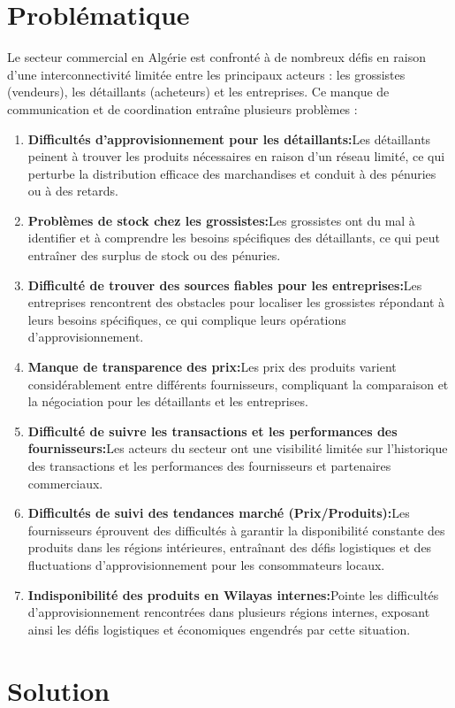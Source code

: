 \documentclass[edit,12pt,a4paper,ChapStyle,oneside,doubleinterligne]{report}
\begin{document}
\section{Problématique}
Le secteur commercial en Algérie est confronté à de nombreux défis en raison d'une interconnectivité limitée entre les principaux acteurs : les grossistes (vendeurs), les détaillants (acheteurs) et les entreprises. Ce manque de communication et de coordination entraîne plusieurs problèmes :
\begin{enumerate}
    \item \textbf{Difficultés d'approvisionnement pour les détaillants:}Les détaillants peinent à trouver les produits nécessaires en raison d'un réseau limité, ce qui perturbe la distribution efficace des marchandises et conduit à des pénuries ou à des retards.
    \item \textbf{Problèmes de stock chez les grossistes:}Les grossistes ont du mal à identifier et à comprendre les besoins spécifiques des détaillants, ce qui peut entraîner des surplus de stock ou des pénuries.
    \item \textbf{Difficulté de trouver des sources fiables pour les entreprises:}Les entreprises rencontrent des obstacles pour localiser les grossistes répondant à leurs besoins spécifiques, ce qui complique leurs opérations d'approvisionnement.
    \item \textbf{Manque de transparence des prix:}Les prix des produits varient considérablement entre différents fournisseurs, compliquant la comparaison et la négociation pour les détaillants et les entreprises.
    \item \textbf{Difficulté de suivre les transactions et les performances des fournisseurs:}Les acteurs du secteur ont une visibilité limitée sur l'historique des transactions et les performances des fournisseurs et partenaires commerciaux.
    \item \textbf{Difficultés de suivi des tendances marché (Prix/Produits):}Les fournisseurs éprouvent des difficultés à garantir la disponibilité constante des produits dans les régions intérieures, entraînant des défis logistiques et des fluctuations d'approvisionnement pour les consommateurs locaux.
    \item \textbf{Indisponibilité des produits en Wilayas internes:}Pointe les difficultés d'approvisionnement rencontrées dans plusieurs régions internes, exposant ainsi les défis logistiques et économiques engendrés par cette situation.
\end{enumerate}
\section{Solution}
\end{document}
